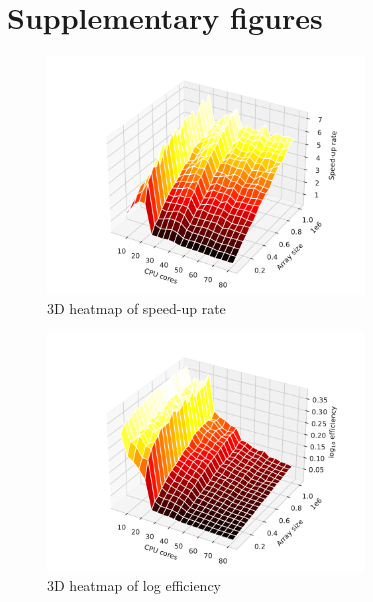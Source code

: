 \documentclass[twoside,12pt]{article}
\theoremstyle{definition}
\theoremstyle{remark}
\begin{document}
\newpage
\appendix

\newpage
\section{Supplementary figures}
\begin{figure}[H]
    \centering
    \includegraphics[width=0.75\textwidth]{../analysis/rate_heatmap_3d.pdf}
    \caption{3D heatmap of speed-up rate}
    \label{fig:rate-heat3d}
\end{figure}

\begin{figure}[H]
    \centering
    \includegraphics[width=0.75\textwidth]{../analysis/logeff_heatmap_3d.pdf}
    \caption{3D heatmap of log efficiency}
    \label{fig:logeff-heat3d}
\end{figure}
\end{document}
